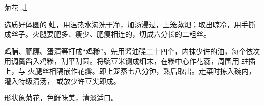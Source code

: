 \begin{recipe}{菊花𧎼蛀}

\ingredients


\preparation

\step 选质好体圆的𧎼蛀，用温热水淘洗干净，加汤浸过，上笼蒸𤆵；取出晾冷，用手撕
成丝子。火腿要肥多、瘦少、肥痩相连的，切成六分长的二粗丝。

\step 鸡脯、肥膘、蛋清等打成“鸡糁”。先用酱油碟二十四个，内抹少许的油，每个依次
用调羹舀入鸡糁，刮平刮圆。将豌豆米铡成细末，在糁中心作花蕊，周围用𧎼蛀插上，与
火腿丝相隔嵌作花瓣。即上笼蒸七八分钟，熟后取出。走菜时拣入碗内，灌入特级清汤，
或放少许豆尖即成。

\features

形状象菊花，色鲜味美，清淡适口。

\end{recipe}

